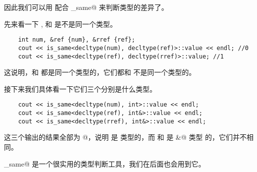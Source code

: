 因此我们可以用 \lstinline@decltype@ 配合 \lstinline@is_same@ 来判断类型的差异了。\par
先来看一下 \lstinline@num@, \lstinline@ref@ 和 \lstinline@rref@ 是不是同一个类型。
\begin{lstlisting}
    int num, &ref {num}, &rref {ref};
    cout << is_same<decltype(num), decltype(ref)>::value << endl; //0
    cout << is_same<decltype(ref), decltype(rref)>::value; //1
\end{lstlisting}
这说明，\lstinline@ref@ 和 \lstinline@rref@ 都是同一个类型的，它们都和 \lstinline@num@ 不是同一个类型的。\par
接下来我们具体看一下它们三个分别是什么类型。
\begin{lstlisting}
    cout << is_same<decltype(num), int>::value << endl;
    cout << is_same<decltype(ref), int&>::value << endl;
    cout << is_same<decltype(rref), int&>::value << endl;
\end{lstlisting}
这三个输出的结果全部为 @，说明 \lstinline@num@ 是 \lstinline@int@ 类型的，而 \lstinline@ref@ 和 \lstinline@rref@ 是 \lstinline@int&@ 类型 的，它们并不相同。\par
\lstinline@is_same@ 是一个很实用的类型判断工具，我们在后面也会用到它。\par
